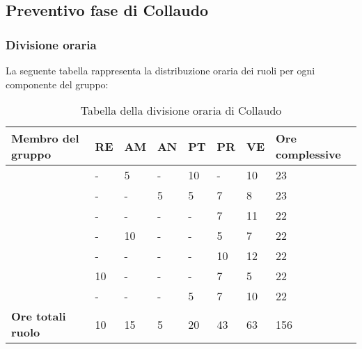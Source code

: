 \subsection{Preventivo fase di Collaudo}

\subsubsection{Divisione oraria}
La seguente tabella rappresenta la distribuzione oraria dei ruoli per ogni componente del gruppo:
{

\renewcommand{\arraystretch}{2}
\begin{longtable}[h!] { C{4cm} C{1cm} C{1cm} C{1cm} C{1cm} C{1cm} C{1cm} C{3cm}}
\caption{Tabella della divisione oraria di Collaudo}	\\
\rowcolor{\primaryColor}

\textcolor{\secondaryColor}{\textbf{Membro del gruppo}} & 
\textcolor{\secondaryColor}{\textbf{RE}} & 
\textcolor{\secondaryColor}{\textbf{AM}} & 
\textcolor{\secondaryColor}{\textbf{AN}} & 
\textcolor{\secondaryColor}{\textbf{PT}} & 
\textcolor{\secondaryColor}{\textbf{PR}} & 
\textcolor{\secondaryColor}{\textbf{VE}} & 
\textcolor{\secondaryColor}{\textbf{Ore complessive}}\\	
\endhead

\AW{}                     &  - &  5 &  - & 10 & - & 10 & 23 \\
\AT{}                     &  - &  - &  5 & 5 & 7 & 8 & 23 \\
\AD{}                     &  - &  - &  - & - & 7 & 11 & 22 \\
\EC{}                     &  - &  10 &  - & - & 5 & 7 & 22 \\
\EM{}                     &  - &  - &  - & - & 10 & 12 & 22 \\
\FP{}                     & 10 & - &  - & - & 7 & 5 & 22 \\
\GG{}                     &  - &  - &  - & 5 & 7 & 10 & 22 \\
\textbf{Ore totali ruolo} & 10 & 15 & 5 & 20 & 43 & 63 & 156 \\

\end{longtable}
}


